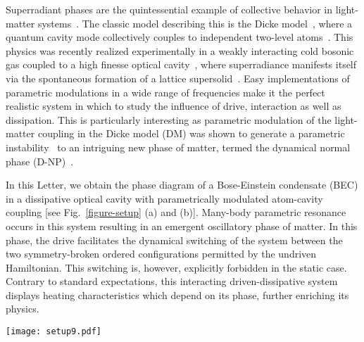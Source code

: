 \documentclass[aps,prl,twocolumn,superscriptaddress,groupedaddress]{revtex4}  %
\begin{document}
 
Superradiant phases are the   quintessential  example of collective behavior in light-matter systems~\cite{Keeling}.
The  classic model describing this is the Dicke model~\cite{Dicke:1954, Hepp:1973, PRLdomokos, Dimer}, where a  quantum cavity mode collectively couples to independent 
two-level atoms~\cite{Hepp:1973, PRLdomokos, Dimer}.   
This physics was recently realized experimentally  in a weakly interacting cold bosonic gas coupled to a high finesse optical 
cavity~\cite{Baumann:2010, Baumann:2011,  Klinder17032015, PRLBakhtiari}, where superradiance manifests itself via the spontaneous formation of a lattice
supersolid~\cite{Brennecke:2013}.  
Easy implementations of parametric modulations in  a wide range of frequencies make it  the perfect  realistic system  in which to study the influence of drive, 
interaction as well as dissipation. 
This is particularly interesting as parametric  modulation of the light-matter coupling  in the Dicke model (DM) was shown to generate a parametric 
instability~\cite{bastidasPRL, Chitra:2015} to an intriguing new phase of matter, termed the dynamical normal phase (D-NP)~\cite{Chitra:2015}.


In this Letter, we obtain the phase diagram of a Bose-Einstein condensate (BEC) in a dissipative optical cavity with parametrically modulated atom-cavity coupling 
[see Fig.~\ref{figure-setup} (a) and (b)].  Many-body parametric resonance occurs in this system resulting in an emergent oscillatory phase of matter. 
In this phase, the drive facilitates the dynamical switching of the system between the two symmetry-broken ordered configurations permitted by the undriven Hamiltonian. 
This switching is, however, explicitly forbidden in the static case. Contrary to standard expectations, this interacting driven-dissipative system displays heating characteristics which depend
on its phase, further enriching its physics.


\begin{figure*}
\centering
\texttt{[image: setup9.pdf]}
\caption{ (a) A BEC in a transversely pumped dissipative cavity, subject to an external harmonic potential of frequency $\omega_x$.  
(b) Laser pump profile $\eta_p(t)$, comprising a ramp-up, a sinusoidally modulated plateau and a 
ramp-down. (c) Time-evolution of the density $\rho(x,t)$ (upper panel) and the self-consistent one-body potential $V(x,t)$ (lower panel) for a time-interval pertaining to the 
plateau for the D-NP. 
(d) Snapshots of the atomic density $\rho (x, t)$ (solid blue line) and one-body potential $V (x, t)$ (dashed orange line) seen by the atoms in the modulated plateau region.
In the upper panel, the BEC is mostly localized on the even sites of the periodic lattice. In the lower panel, the BEC is mostly localized on the odd sites. 
The drive causes atoms of the BEC oscillate in time between even and odd sites of the periodic lattice in the D-NP.  }
\label{figure-setup}
\end{figure*}
 
\end{document}

